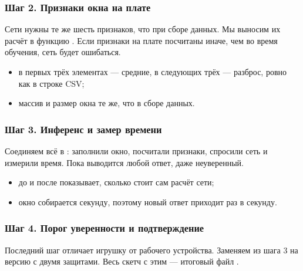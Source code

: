 \subsubsection{Шаг 2. Признаки окна на плате}

Сети нужны те же шесть признаков, что при сборе данных. Мы выносим их расчёт в функцию
. Если признаки на плате посчитаны иначе, чем во время обучения, сеть будет ошибаться.


\begin{itemize}[leftmargin=*]
  \item в первых трёх элементах --- средние, в следующих трёх --- разброс, ровно как в строке CSV;
  \item массив  и размер окна те же, что в сборе данных.
\end{itemize}

\subsubsection{Шаг 3. Инференс и замер времени}

Соединяем всё в : заполнили окно, посчитали признаки, спросили сеть и измерили время.
Пока выводится любой ответ, даже неуверенный.


\begin{itemize}[leftmargin=*]
  \item {} до и после  показывает, сколько стоит сам расчёт сети;
  \item окно собирается секунду, поэтому новый ответ приходит раз в секунду.
\end{itemize}

\subsubsection{Шаг 4. Порог уверенности и подтверждение}

Последний шаг отличает игрушку от рабочего устройства. Заменяем  из шага 3 на версию с двумя
защитами. Весь скетч с этим  --- итоговый файл .


